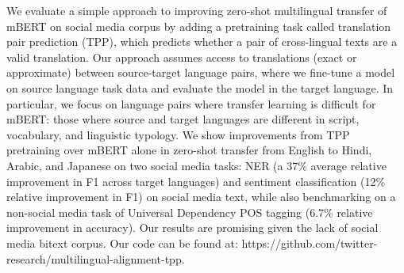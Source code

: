 We evaluate a simple approach to improving zero-shot multilingual transfer of mBERT on social media corpus by adding a pretraining task called translation pair prediction (TPP), which predicts whether a pair of cross-lingual texts are a valid translation. Our approach assumes access to translations (exact or approximate) between source-target language pairs, where we fine-tune a model on source language task data and evaluate the model in the target language. In particular, we focus on language pairs where transfer learning is difficult for mBERT: those where source and target languages are different in script, vocabulary, and linguistic typology. We show improvements from TPP pretraining over mBERT alone in zero-shot transfer from English to Hindi, Arabic, and Japanese on two social media tasks: NER (a 37\% average relative improvement in F1 across target languages) and sentiment classification (12\% relative improvement in F1) on social media text, while also benchmarking on a non-social media task of Universal Dependency POS tagging (6.7\% relative improvement in accuracy). Our results are promising given the lack of social media bitext corpus. Our code can be found at: https://github.com/twitter-research/multilingual-alignment-tpp.

